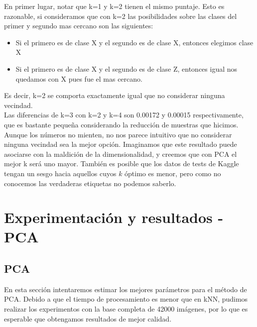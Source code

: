 En primer lugar, notar que k=1 y k=2 tienen el mismo puntaje. Esto es razonable, si consideramos que con k=2 las posibilidades sobre las clases del primer y segundo mas cercano son las siguientes: \\
\begin{itemize}
\item Si el primero es de clase X y el segundo es de clase X, entonces elegimos clase X
\item Si el primero es de clase X y el segundo es de clase Z, entonces igual nos quedamos con X pues fue el mas cercano.
\end{itemize}

Es decir, k=2 se comporta exactamente igual que no considerar ninguna vecindad. \\

Las diferencias de k=3 con k=2 y k=4 son 0.00172 y 0.00015 respectivamente, que es bastante pequeña considerando la reducción de muestras que hicimos. \\

Aunque los números no mienten, no nos parece intuitivo que no considerar ninguna vecindad sea la mejor opción. Imaginamos que este resultado puede asociarse con la maldición de la dimensionalidad, y creemos que con PCA el mejor k será uno mayor. También es posible que los datos de tests de Kaggle tengan un sesgo hacia aquellos cuyos $k$ óptimo es menor, pero como no conocemos las verdaderas etiquetas no podemos saberlo. \\


\section{Experimentación y resultados - PCA}

\subsection{PCA}

En esta sección intentaremos estimar los mejores parámetros para el método de PCA. Debido a que el tiempo de procesamiento es menor que en kNN, pudimos realizar los experimentos con la base completa de 42000 imágenes, por lo que es esperable que obtengamos resultados de mejor calidad. \\

